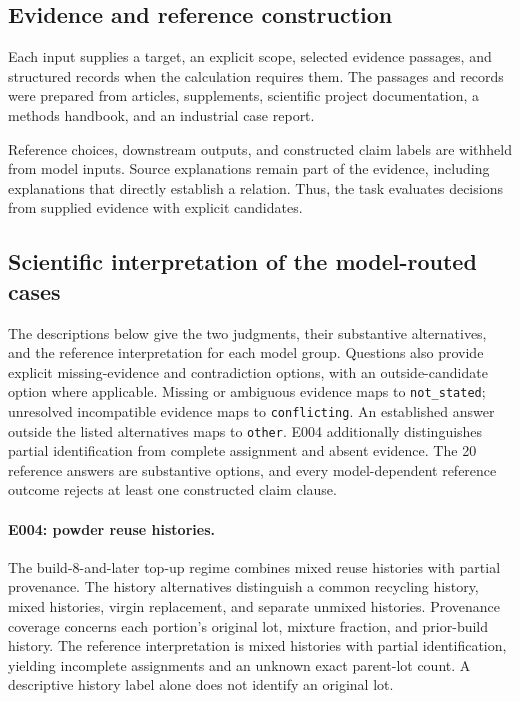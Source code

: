 \subsection{Evidence and reference construction}

Each input supplies a target, an explicit scope, selected evidence passages, and structured records when the calculation requires them. The passages and records were prepared from articles, supplements, scientific project documentation, a methods handbook, and an industrial case report.

Reference choices, downstream outputs, and constructed claim labels are withheld from model inputs. Source explanations remain part of the evidence, including explanations that directly establish a relation. Thus, the task evaluates decisions from supplied evidence with explicit candidates.

\subsection{Scientific interpretation of the model-routed cases}

The descriptions below give the two judgments, their substantive alternatives, and the reference interpretation for each model group. Questions also provide explicit missing-evidence and contradiction options, with an outside-candidate option where applicable. Missing or ambiguous evidence maps to \texttt{not\_stated}; unresolved incompatible evidence maps to \texttt{conflicting}. An established answer outside the listed alternatives maps to \texttt{other}. E004 additionally distinguishes partial identification from complete assignment and absent evidence. The 20 reference answers are substantive options, and every model-dependent reference outcome rejects at least one constructed claim clause.

\paragraph{E004: powder reuse histories.}
The build-8-and-later top-up regime combines mixed reuse histories with partial provenance. The history alternatives distinguish a common recycling history, mixed histories, virgin replacement, and separate unmixed histories. Provenance coverage concerns each portion's original lot, mixture fraction, and prior-build history. The reference interpretation is mixed histories with partial identification, yielding incomplete assignments and an unknown exact parent-lot count. A descriptive history label alone does not identify an original lot.


